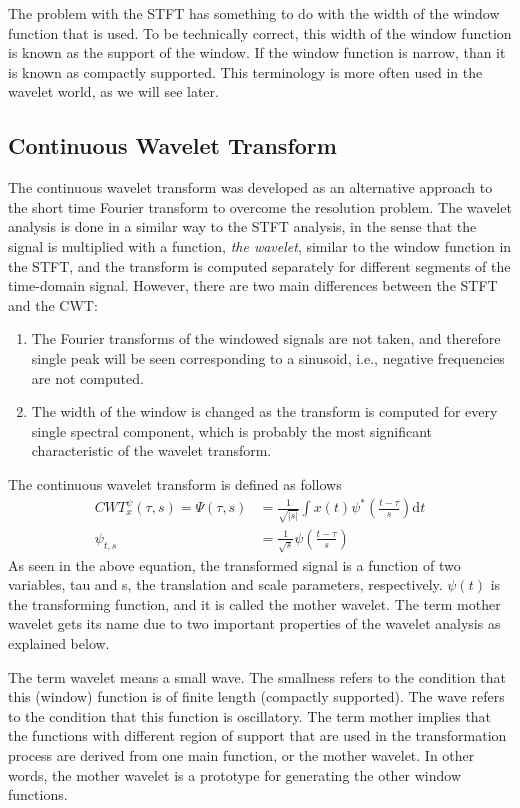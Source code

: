 \documentclass[12pt, a4paper, twoside]{report}
\begin{document}
The problem with the STFT has something to do with the width of the window function that is used. To be technically correct, this width of the window function is known as the support of the window. If the window function is narrow, than it is known as compactly supported. This terminology is more often used in the wavelet world, as we will see later.

\subsection{Continuous Wavelet Transform}
The continuous wavelet transform was developed as an alternative approach to the short time Fourier transform to overcome the resolution problem. The wavelet analysis is done in a similar way to the STFT analysis, in the sense that the signal is multiplied with a function, {\it the wavelet}, similar to the window function in the STFT, and the transform is computed separately for different segments of the time-domain signal. However, there are two main differences between the STFT and the CWT: 
\begin{enumerate}
\item The Fourier transforms of the windowed signals are not taken, and therefore single peak will be seen corresponding to a sinusoid, i.e., negative frequencies are not computed. 
\item The width of the window is changed as the transform is computed for every single spectral component, which is probably the most significant characteristic of the wavelet transform. 
\end{enumerate}
The continuous wavelet transform is defined as follows
\begin{align}
CWT_{x}^{\psi}(\tau, s) = \Psi (\tau, s) &= \frac{1}{\sqrt{\left | s \right |}} \int x(t) \psi^{*} \left ( \frac{t-\tau}{s} \right ) \text{d}t \\
\psi_{t,s} &= \frac{1}{\sqrt{s}} \psi \left ( \frac{t - \tau}{s} \right )
\end{align}
As seen in the above equation, the transformed signal is a function of two variables, tau and s, the translation and scale parameters, respectively. $\psi(t)$ is the transforming function, and it is called the mother wavelet. The term mother wavelet gets its name due to two important properties of the wavelet analysis as explained below.
\par
The term wavelet means a small wave. The smallness refers to the condition that this (window) function is of finite length (compactly supported). The wave refers to the condition that this function is oscillatory. The term mother implies that the functions with different region of support that are used in the transformation process are derived from one main function, or the mother wavelet. In other words, the mother wavelet is a prototype for generating the other window functions. 
\end{document}
